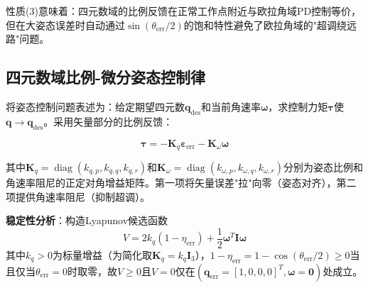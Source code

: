 性质(3)意味着：四元数域的比例反馈在正常工作点附近与欧拉角域PD控制等价，但在大姿态误差时自动通过$\sin(\theta_{\text{err}}/2)$的饱和特性避免了欧拉角域的"超调绕远路"问题。

\subsection{四元数域比例-微分姿态控制律}

将姿态控制问题表述为：给定期望四元数$\mathbf{q}_{\text{des}}$和当前角速率$\boldsymbol{\omega}$，求控制力矩$\boldsymbol{\tau}$使$\mathbf{q} \to \mathbf{q}_{\text{des}}$。采用矢量部分的比例反馈\cite{wie1989quaternion,fresk2013full}：

\begin{equation}
    \boxed{\boldsymbol{\tau} = -\mathbf{K}_q \boldsymbol{\varepsilon}_{\text{err}} - \mathbf{K}_\omega \boldsymbol{\omega}}
    \label{eq:quat_pd}
\end{equation}

其中$\mathbf{K}_q = \operatorname{diag}(k_{q,p}, k_{q,q}, k_{q,r})$和$\mathbf{K}_\omega = \operatorname{diag}(k_{\omega,p}, k_{\omega,q}, k_{\omega,r})$分别为姿态比例和角速率阻尼的正定对角增益矩阵。第一项将矢量误差"拉"向零（姿态对齐），第二项提供角速率阻尼（抑制超调）。

\textbf{稳定性分析}：构造Lyapunov候选函数
\begin{equation}
    V = 2k_q(1 - \eta_{\text{err}}) + \frac{1}{2}\boldsymbol{\omega}^T \mathbf{I} \boldsymbol{\omega}
    \label{eq:lyap_quat}
\end{equation}
其中$k_q > 0$为标量增益（为简化取$\mathbf{K}_q = k_q\mathbf{I}_3$），$1-\eta_{\text{err}} = 1-\cos(\theta_{\text{err}}/2) \geq 0$当且仅当$\theta_{\text{err}}=0$时取零，故$V \geq 0$且$V=0$仅在$(\mathbf{q}_{\text{err}}=[1,0,0,0]^T, \boldsymbol{\omega}=\mathbf{0})$处成立。

